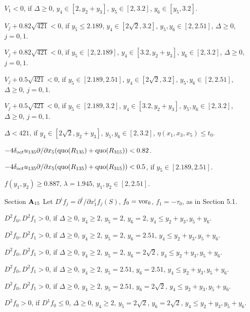 $V_1 < 0$, 
if $\Delta\ge0$, $y_4\in[2,y_2+y_3]$, $y_5\in[2,3.2]$,
		$y_6\in[y_5,3.2]$.

$V_j + 0.82\sqrt{421}<0$, if $y_5\le2.189$, $y_4\in[2\sqrt{2},3.2]$,
		$y_5,y_6\in[2,2.51]$, $\Delta\ge0$, $j=0,1$.

$V_j + 0.82\sqrt{421}<0$, if $y_5\in[2,2.189]$, $y_4\in [3.2,y_2+y_3]$,
		$y_6\in[2,3.2]$, $\Delta\ge0$, $j=0,1$.

$V_j + 0.5\sqrt{421}<0$, if $y_5\in[2.189,2.51]$, $y_4\in[2\sqrt{2},3.2]$,
		$y_5,y_6\in[2,2.51]$, $\Delta\ge0$, $j=0,1$.

$V_j + 0.5\sqrt{421}<0$, if $y_5\in[2.189,3.2]$, $y_4\in[3.2,y_2+y_3]$,
		$y_5,y_6\in[2,3.2]$, $\Delta\ge0$, $j=0,1$.

$\Delta<421$, if $y_4\in[2\sqrt{2},y_2+y_3]$, $y_5,y_6\in[2,3.2]$, 
	$\eta(x_1,x_3, x_5)\le t_0$.

$-4\delta_{oct} u_{135} \partial/\partial x_5 (\operatorname{quo}(R_{135})+\operatorname{quo}(R_{315}))< 0.82$.

$-4\delta_{oct} u_{135} \partial/\partial x_5 (\operatorname{quo}(R_{135})+\operatorname{quo}(R_{315}))< 0.5$,
	if $y_5\in[2.189,2.51]$.

$f(y_1,y_2)\ge 0.887$, $\lambda=1.945$, $y_1,y_2\in[2,2.51]$.



\subhead Section ${\bold A}_{15}$\endsubhead
Let $D^if_j = \partial^i/\partial x_1^i f_j(S)$,
$f_0=\operatorname{vor}_0$, $f_1=-\tau_0$, as in Section 5.1.

$D^2f_0, D^2f_1>0$, if $\Delta\ge0$, $y_4\ge2$, $y_5=2$, $y_6=2$,
	$y_4\le y_2+y_3,y_5+y_6$.

$D^2f_0, D^2f_1>0$, if $\Delta\ge0$, $y_4\ge2$, $y_5=2$, $y_6=2.51$,
	$y_4\le y_2+y_3,y_5+y_6$.

$D^2f_0, D^2f_1>0$, if $\Delta\ge0$, $y_4\ge2$, $y_5=2$, $y_6=2\sqrt{2}$,
	$y_4\le y_2+y_3,y_5+y_6$.

$D^2f_0, D^2f_1>0$, if $\Delta\ge0$, $y_4\ge2$, $y_5=2.51$, $y_6=2.51$,
	$y_4\le y_2+y_3,y_5+y_6$.

$D^2f_0, D^2f_1>0$, if $\Delta\ge0$, $y_4\ge2$, $y_5=2.51$, $y_6=2\sqrt{2}$,
	$y_4\le y_2+y_3,y_5+y_6$.

$D^2f_0 >0$, if $D^1f_0\le0$, 
	$\Delta\ge0$, $y_4\ge2$, $y_5=2\sqrt{2}$, $y_6=2\sqrt{2}$,
	$y_4\le y_2+y_3,y_5+y_6$.


